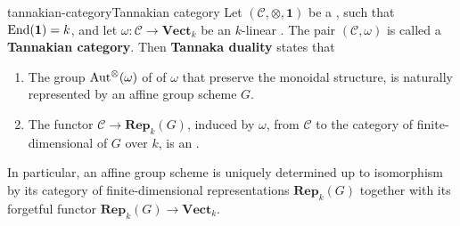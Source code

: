 \begin{topic}{tannakian-category}{Tannakian category}
    Let $(\mathcal{C}, \otimes, \textbf{1})$ be a    , such that $\textup{End}(\textbf{1}) = k$, and let $\omega \colon \mathcal{C} \to \textbf{Vect}_k$ be an   $k$-linear  . The pair $(\mathcal{C}, \omega)$ is called a \textbf{Tannakian category}. Then \textbf{Tannaka duality} states that
    \begin{enumerate}[label=(\roman*)]
        \item The group $\textup{Aut}^\otimes(\omega)$ of  of $\omega$ that preserve the monoidal structure, is naturally represented by an affine group scheme $G$.
        \item The functor $\mathcal{C} \to \textbf{Rep}_k(G)$, induced by $\omega$, from $\mathcal{C}$ to the category of finite-dimensional  of $G$ over $k$, is an .
    \end{enumerate}
    In particular, an affine group scheme is uniquely determined up to isomorphism by its category of finite-dimensional representations $\textbf{Rep}_k(G)$ together with its forgetful functor $\textbf{Rep}_k(G) \to \textbf{Vect}_k$.
\end{topic}

